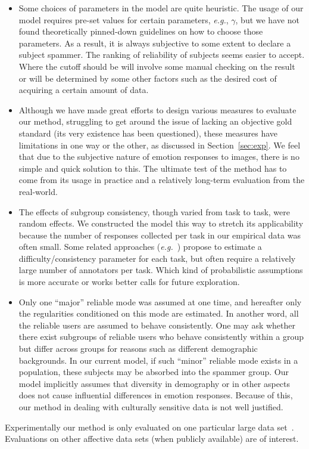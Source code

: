 \documentclass[10pt,journal,letterpaper,compsoc,twoside]{IEEEtran}
\begin{document}
\begin{itemize}
\item
{Some choices of parameters in the model are quite heuristic. The usage of our model requires pre-set values for certain parameters, {\it e.g.}, $\gamma$, but we have not found theoretically pinned-down guidelines on how to choose those parameters. As a result, it is always subjective to some extent to declare a subject spammer. The ranking of reliability of subjects seems easier to accept. Where the cutoff should be will involve some manual checking on the result or will be determined by some other factors such as the desired cost of acquiring a certain amount of data. }
\item
{Although we have made great efforts to design various measures to evaluate our method, struggling to get around the issue of lacking an objective gold standard (its very existence has been questioned), these measures have limitations in one way or the other, as discussed in Section~\ref{sec:exp}. We feel that due to the subjective nature of emotion responses to images, there is no simple and quick solution to this. The ultimate test of the method has to come from its usage in practice and a relatively long-term evaluation from the real-world.}
\item The effects of subgroup consistency, though varied from task to task,
were random effects. We constructed the model this way to stretch its applicability because
the number of responses collected per task in our empirical data was often small. 
{Some related approaches ({\it e.g.}~\cite{whitehill2009whose}) propose to estimate a difficulty/consistency parameter for each task,
but often require a relatively large number of annotators per task. }
Which kind of probabilistic assumptions is more accurate or works better calls for future exploration.
\item Only one ``major'' reliable mode was assumed at one time, and hereafter only the regularities 
conditioned on this mode are estimated. In another word, all the reliable users are assumed to behave consistently. One may ask whether there exist subgroups of reliable users who behave consistently within a group but differ across groups for reasons such as different demographic backgrounds. In our current model, if such ``minor'' reliable mode exists in a population, these subjects may be absorbed into the spammer group. Our model implicitly assumes that diversity in demography or in other aspects does not cause influential differences in emotion responses. 
{Because of this, our method in dealing with culturally sensitive data is not well justified.}
\end{itemize}
{Experimentally our method is only evaluated on one particular large data set~\cite{xin2016}. 
Evaluations on other affective data sets (when publicly available) are of interest.}
\end{document}
